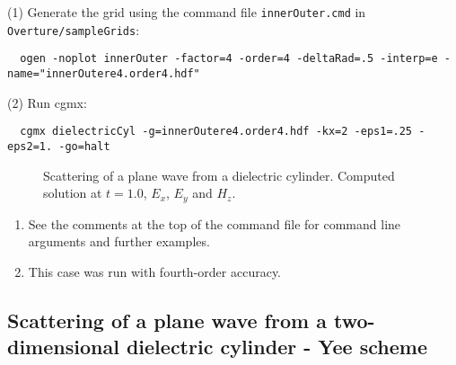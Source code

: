 \documentclass{article}
\begin{document}
\noindent (1) Generate the grid using the command file {\tt innerOuter.cmd} in {\tt Overture/sampleGrids}:
{\small
\begin{verbatim}
  ogen -noplot innerOuter -factor=4 -order=4 -deltaRad=.5 -interp=e -name="innerOutere4.order4.hdf"
\end{verbatim}
}
\noindent (2) Run cgmx: 
\begin{verbatim}
  cgmx dielectricCyl -g=innerOutere4.order4.hdf -kx=2 -eps1=.25 -eps2=1. -go=halt
\end{verbatim}

{
\begin{figure}[hbt]
\newcommand{\figWidth}{5.5cm}
\newcommand{\trimfig}[2]{\trimFig{#1}{#2}{0.1}{0.05}{.05}{.05}}
\begin{center}
\end{center}
\caption{Scattering of a plane wave from a dielectric cylinder. Computed solution at $t=1.0$, $E_x$, $E_y$ and $H_z$.}
\label{fig:cyl2dDielectricScat}
\end{figure}
}

\begin{enumerate}
  \item See the comments at the top of the command file for command line arguments and further examples.
  \item This case was run with fourth-order accuracy.
\end{enumerate}

\clearpage
\subsection{Scattering of a plane wave from a two-dimensional dielectric cylinder - Yee scheme} \label{sec:cyl2dDielectricScat}
\end{document}
